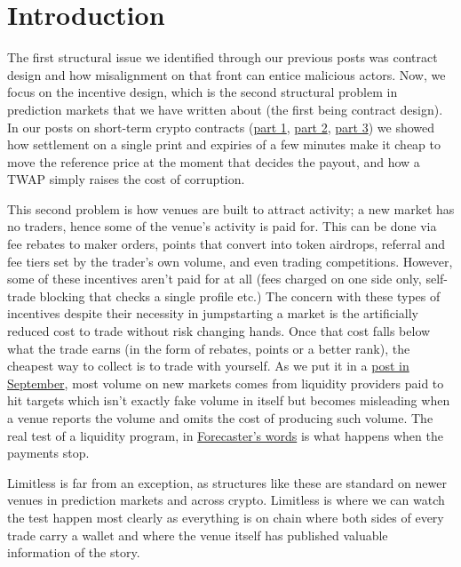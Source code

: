 \documentclass[11pt]{article}
\begin{document}
\section{Introduction}

The first structural issue we identified through our previous posts was contract design and how misalignment on that front can entice malicious actors.
Now, we focus on the incentive design, which is the second structural problem in prediction markets that we have written about (the first being contract design).
In our posts on short-term crypto contracts (\href{https://x.com/TeodorTankov/status/2102741111752011850}{part 1}, \href{https://x.com/TeodorTankov/status/2103207721218855036}{part 2}, \href{https://x.com/TeodorTankov/status/2103865218501693906}{part 3}) we showed how settlement on a single print and expiries of a few minutes make it cheap to move the reference price at the moment that decides the payout, and how a TWAP simply raises the cost of corruption.

This second problem is how venues are built to attract activity; a new market has no traders, hence some of the venue's activity is paid for.
This can be done via fee rebates to maker orders, points that convert into token airdrops, referral and fee tiers set by the trader's own volume, and even trading competitions.
However, some of these incentives aren't paid for at all (fees charged on one side only, self-trade blocking that checks a single profile etc.)
The concern with these types of incentives despite their necessity in jumpstarting a market is the artificially reduced cost to trade without risk changing hands.
Once that cost falls below what the trade earns (in the form of rebates, points or a better rank), the cheapest way to collect is to trade with yourself.
As we put it in a \href{https://x.com/TeodorTankov/status/2103520926465753470}{post in September}, most volume on new markets comes from liquidity providers paid to hit targets which isn't exactly fake volume in itself but becomes misleading when a venue reports the volume and omits the cost of producing such volume.
The real test of a liquidity program, in \href{https://x.com/0xForecaster/status/2103502498452906396}{Forecaster's words} is what happens when the payments stop.

Limitless is far from an exception, as structures like these are standard on newer venues in prediction markets and across crypto.
Limitless is where we can watch the test happen most clearly as everything is on chain where both sides of every trade carry a wallet and where the venue itself has published valuable information of the story.
\end{document}
